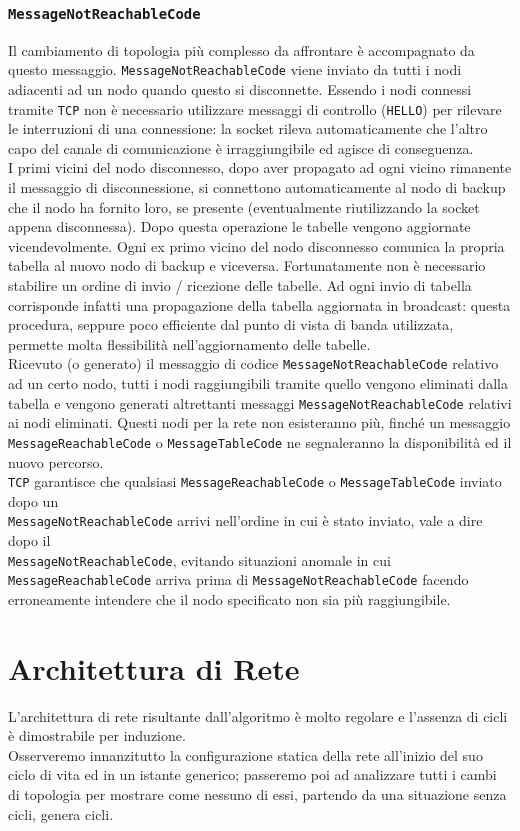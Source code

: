 \documentclass[10pt]{article} %
\begin{document}
\subsubsection{{\tt MessageNotReachableCode}}
	Il cambiamento di topologia più complesso da affrontare è accompagnato da questo messaggio. {\tt MessageNotReachableCode} viene inviato da tutti i nodi adiacenti ad un nodo quando questo si disconnette. Essendo i nodi connessi tramite { \tt TCP} non è necessario utilizzare messaggi di controllo ({\tt HELLO}) per rilevare le interruzioni di una connessione: la socket rileva automaticamente che l'altro capo del canale di comunicazione è irraggiungibile ed agisce di conseguenza.\\
	I primi vicini del nodo disconnesso, dopo aver propagato ad ogni vicino rimanente il messaggio di disconnessione, si connettono automaticamente al nodo di backup che il nodo ha fornito loro, se presente (eventualmente riutilizzando la socket appena disconnessa). Dopo questa operazione le tabelle vengono aggiornate vicendevolmente. Ogni ex primo vicino del nodo disconnesso comunica la propria tabella al nuovo nodo di backup e viceversa. Fortunatamente non è necessario stabilire un ordine di invio / ricezione delle tabelle. Ad ogni invio di tabella corrisponde infatti una propagazione della tabella aggiornata in broadcast: questa procedura, seppure poco efficiente dal punto di vista di banda utilizzata, permette molta flessibilità nell'aggiornamento delle tabelle. \\
	Ricevuto (o generato) il messaggio di codice {\tt MessageNotReachableCode} relativo ad un certo nodo, tutti i nodi raggiungibili tramite quello vengono eliminati dalla tabella e vengono generati altrettanti messaggi {\tt MessageNotReachableCode} relativi ai nodi eliminati. Questi nodi per la rete non esisteranno più, finché un messaggio {\tt MessageReachableCode} o {\tt MessageTableCode} ne segnaleranno la disponibilità ed il nuovo percorso. \\
	{\tt TCP} garantisce che qualsiasi {\tt MessageReachableCode} o {\tt MessageTableCode} inviato dopo un\\ {\tt MessageNotReachableCode} arrivi nell'ordine in cui è stato inviato, vale a dire dopo il \\	 {\tt MessageNotReachableCode}, evitando situazioni anomale in cui {\tt MessageReachableCode} arriva prima di {\tt MessageNotReachableCode} facendo erroneamente intendere che il nodo specificato non sia più raggiungibile.

\section{Architettura di Rete}
L'architettura di rete risultante dall'algoritmo è molto regolare e l'assenza di cicli è dimostrabile per induzione. \\
Osserveremo innanzitutto la configurazione statica della rete all'inizio del suo ciclo di vita ed in un istante generico; passeremo poi ad analizzare tutti i cambi di topologia per mostrare come nessuno di essi, partendo da una situazione senza cicli, genera cicli.
\end{document}
